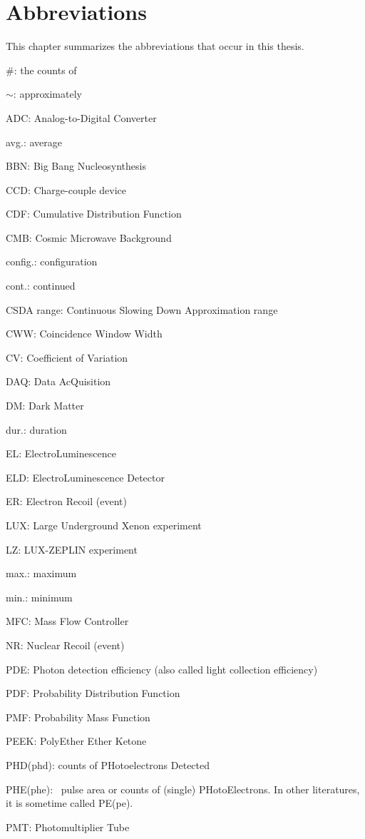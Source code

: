 \chapter{Abbreviations}
\label{chapter:abbrev}
This chapter summarizes the abbreviations that occur in this thesis.

\#: the counts of

$\sim$: approximately

ADC: Analog-to-Digital Converter

avg.: average

BBN: Big Bang Nucleosynthesis

CCD: Charge-couple device

CDF:  Cumulative Distribution Function

CMB: Cosmic Microwave Background

config.: configuration

cont.: continued

CSDA range: Continuous Slowing Down Approximation range

CWW: Coincidence Window Width

CV: Coefficient of Variation

DAQ: Data AcQuisition

DM: Dark Matter

dur.: duration

EL: ElectroLuminescence

ELD: ElectroLuminescence Detector

ER: Electron Recoil (event)

LUX: Large Underground Xenon experiment

LZ: LUX-ZEPLIN experiment

max.: maximum

min.: minimum

MFC: Mass Flow Controller

NR: Nuclear Recoil (event)

PDE: Photon detection efficiency (also called light collection efficiency)

PDF: Probability Distribution Function

PMF: Probability Mass Function

PEEK: PolyEther Ether Ketone

PHD(phd): counts of PHotoelectrons Detected

PHE(phe): \sphe\ pulse area or counts of (single) PHotoElectrons. In other literatures, it is sometime called PE(pe).

PMT: Photomultiplier Tube

